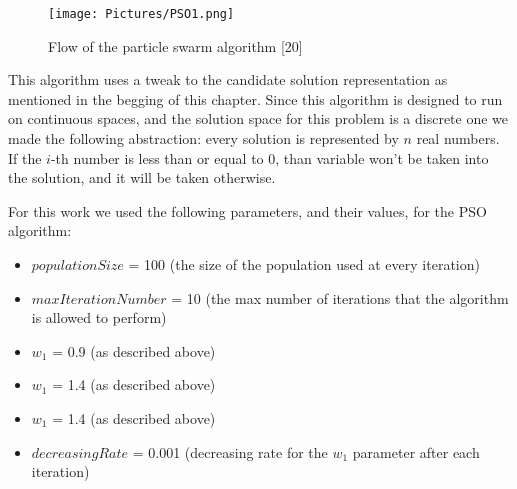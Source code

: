 \begin{figure}
	\texttt{[image: Pictures/PSO1.png]}
	\caption{ Flow of the particle swarm algorithm [20]}
	\label{Flow of the particle swarm algorithm}
\end{figure}

This algorithm uses a tweak to the candidate solution representation as mentioned in the begging of this chapter. Since this algorithm is designed to run on continuous spaces, and the solution space for this problem is a discrete one we made the following abstraction: every solution is represented by $n$ real numbers. If the $i$-th number is less than or equal to 0, than variable won't be taken into the solution, and it will be taken otherwise.

For this work we used the following parameters, and their values, for the PSO algorithm:
\begin{itemize}
	\item $populationSize$ = 100 (the size of the population used at every iteration)
	\item $maxIterationNumber$ = 10 (the max number of iterations that the algorithm is allowed to perform)
	\item $w_1$ = 0.9 (as described above)
	\item $w_1$ = 1.4 (as described above)
	\item $w_1$ = 1.4 (as described above)
	\item $decreasingRate$ = 0.001 (decreasing rate for the $w_1$ parameter after each iteration)
\end{itemize}